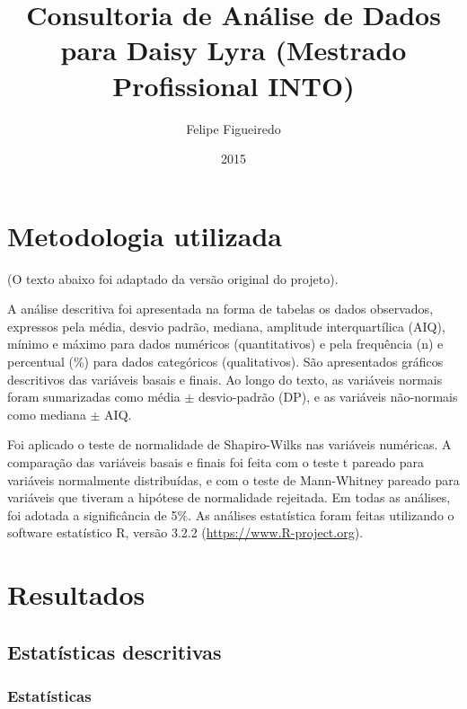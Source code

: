 \documentclass[a4paper]{article}
\author{Felipe Figueiredo}
\title{Consultoria de Análise de Dados para Daisy Lyra (Mestrado Profissional INTO)}
\date{2015}
\begin{document}
\maketitle
\newpage
\tableofcontents
\listoffigures
\listoftables
\newpage
\section{Metodologia utilizada}

(O texto abaixo foi adaptado da versão original do projeto).


A análise descritiva foi apresentada na forma de tabelas os dados observados, expressos pela média, desvio padrão, mediana, amplitude interquartílica (AIQ), mínimo e máximo para dados numéricos (quantitativos) e pela frequência (n) e percentual (\%) para dados categóricos (qualitativos). São apresentados gráficos descritivos das variáveis basais e finais. Ao longo do texto, as variáveis normais foram sumarizadas como média $\pm$ desvio-padrão (DP), e as variáveis não-normais como mediana $\pm$ AIQ.



Foi aplicado o teste de normalidade de Shapiro-Wilks nas variáveis numéricas. A comparação das variáveis basais e finais foi feita com o teste t pareado para variáveis normalmente distribuídas,  e com o teste de Mann-Whitney pareado para variáveis que tiveram a hipótese de normalidade rejeitada. Em todas as análises, foi adotada a  significância de 5\%. As análises estatística foram feitas utilizando o software estatístico R, versão 3.2.2 (\url{https://www.R-project.org}).

\section{Resultados}

\subsection{Estatísticas descritivas}

\subsubsection{Estatísticas}
\end{document}
